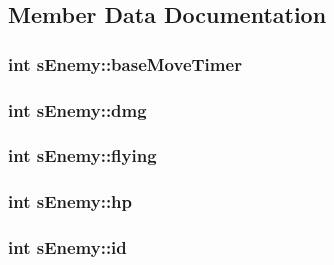 \subsection{Member Data Documentation}
\hypertarget{structs_enemy_aabc5707d86db96a7deca75934a8cb05f}{}
\subsubsection[{base\+Move\+Timer}]{\setlength{\rightskip}{0pt plus 5cm}int s\+Enemy\+::base\+Move\+Timer}\label{structs_enemy_aabc5707d86db96a7deca75934a8cb05f}
\hypertarget{structs_enemy_ac469a015604c8a1206eaacb5a9de3fae}{}
\subsubsection[{dmg}]{\setlength{\rightskip}{0pt plus 5cm}int s\+Enemy\+::dmg}\label{structs_enemy_ac469a015604c8a1206eaacb5a9de3fae}
\hypertarget{structs_enemy_a3564672ff00ff59fafdd7b00b7c89eac}{}
\subsubsection[{flying}]{\setlength{\rightskip}{0pt plus 5cm}int s\+Enemy\+::flying}\label{structs_enemy_a3564672ff00ff59fafdd7b00b7c89eac}
\hypertarget{structs_enemy_a1bd3cc9ffeda48c3b645bfc8e4e3bb02}{}
\subsubsection[{hp}]{\setlength{\rightskip}{0pt plus 5cm}int s\+Enemy\+::hp}\label{structs_enemy_a1bd3cc9ffeda48c3b645bfc8e4e3bb02}
\hypertarget{structs_enemy_abe78ad5ba13cad652d467e4fdb5681ed}{}
\subsubsection[{id}]{\setlength{\rightskip}{0pt plus 5cm}int s\+Enemy\+::id}\label{structs_enemy_abe78ad5ba13cad652d467e4fdb5681ed}
\hypertarget{structs_enemy_ab28dbc0855768585087a8ffbd2da9ddf}{}
